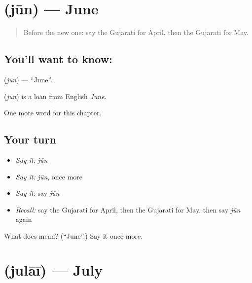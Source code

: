 \section[\texorpdfstring{\gu{જૂન} (jūn)}{જૂન (jūn)}]{ (jūn) — June}

\label{lesson:GU-C96-jun}



\begin{quote}
Before the new one: say the Gujarati for April, then the Gujarati for May.
\end{quote}

\subsection*{You'll want to know: }
\textbf{} (\emph{jūn}) — \textquotedblleft{}June\textquotedblright{}.

\begin{cousinweb}
\textbf{} (\emph{jūn}) is a loan from English \emph{June}.
\end{cousinweb}

\begin{grammarlens}[title={What you've built}]
One more word for this chapter.
\end{grammarlens}

\subsection*{Your turn}
\begin{itemize}
\raggedright
  \item \emph{Say it:} \emph{jūn}
  \item \emph{Say it:} \emph{jūn}, once more
  \item \emph{Say it:} say \emph{jūn}
  \item \emph{Recall:} say the Gujarati for April, then the Gujarati for May, then say \emph{jūn} again
\end{itemize}

\begin{tcolorbox}[breakable,colback=teal!4,colframe=teal!35!black,title={Before you move on}]
What does  mean? (\textquotedblleft{}June\textquotedblright{}.) Say it once more.
\end{tcolorbox}
\section[\texorpdfstring{\gu{જુલાઈ} (julāī)}{જુલાઈ (julāī)}]{ (julāī) — July}

